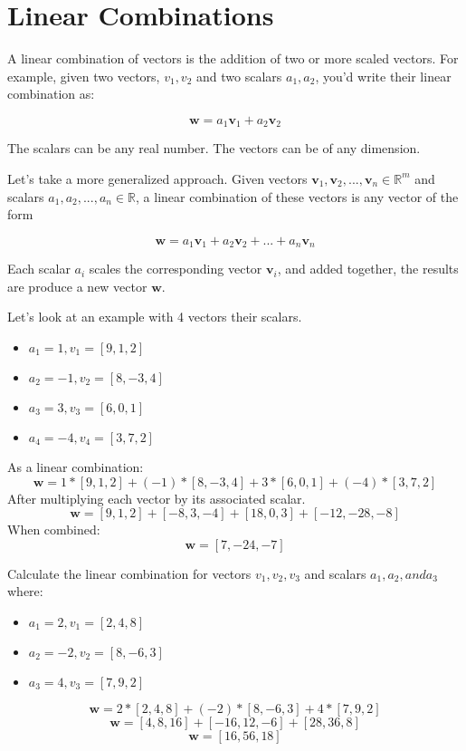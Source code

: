 \chapter{Linear Combinations}

A linear combination of vectors is the addition of two or more scaled vectors. For example, given two vectors, ${v}_1, {v}_2$ and two scalars $a_1,a_2$, you'd write their linear combination as:

\[
\mathbf{w} = a_1\mathbf{v}_1 + a_2\mathbf{v}_2
\]

The scalars can be any real number. The vectors can be of any dimension. 

Let's take a more generalized approach. Given vectors $\mathbf{v}_1,
\mathbf{v}_2, ..., \mathbf{v}_n \in \mathbb{R}^m$ and scalars $a_1,
a_2, ..., a_n \in \mathbb{R}$, a linear combination of these vectors
is any vector of the form

\[
\mathbf{w} = a_1\mathbf{v}_1 + a_2\mathbf{v}_2 + ... + a_n\mathbf{v}_n
\]

Each scalar $a_i$ scales the corresponding vector $\mathbf{v}_i$, and
added together, the results are produce a new vector $\mathbf{w}$.

Let's look at an example with 4 vectors their scalars. 
\begin{itemize}
\item $a_1 = 1, v_1 = [9, 1, 2]$
\item $a_2 = -1, v_2 = [8, -3, 4]$
\item $a_3 = 3, v_3 = [6, 0, 1]$
\item $a_4 = -4, v_4 = [3, 7, 2]$
\end{itemize}
As a linear combination:
\[
\mathbf{w} = 1*[9,1,2] + (-1)*[8, -3, 4]+ 3*[6,0,1] + (-4)*[3,7,2]
\]
After multiplying each vector by its associated scalar.
 \[
\mathbf{w} = [9, 1, 2] + [-8, 3, -4] + [18, 0, 3] + [-12, -28, -8]
\]
When combined:
\[
\mathbf{w} = [7, -24, -7]
\]

\begin{Exercise}[title={Linear Combination}, label=linear_combination01]
Calculate the linear combination for vectors $v_1, v_2, v_3$ and scalars $a_1, a_2, and a_3$ where:   
	\begin{itemize}
      \item $a_1 = 2, v_1 =[2, 4, 8]$
      \item $a_2 = -2,v_2 =[8, -6, 3]$
      \item $a_3 = 4,v_3 =[7, 9, 2]$
	\end{itemize}
\end{Exercise}
\begin{Answer}[ref=linear_combination01]
     \[
	\mathbf{w} = 2*[2,4,8] + (-2)*[8,-6,3] + 4*[7,9,2] 
	\]
  	\[
	\mathbf{w} = [4,8,16] + [-16,12,-6] + [28,36,8] 
	\]  
 	\[
	\mathbf{w} = [16, 56, 18]  
	\]   
\end{Answer}

